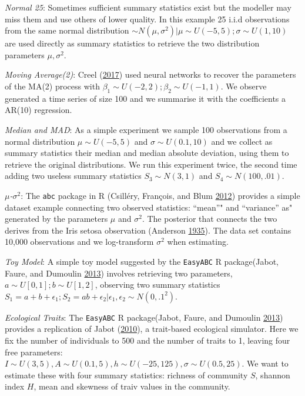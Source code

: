 \documentclass[]{article}
\begin{document}
\emph{Normal 25}: Sometimes sufficient summary statistics exist but the modeller may miss them and use others of lower quality.
In this example 25 i.i.d observations from the same normal distribution \(\sim N(\mu,\sigma^2)| \mu \sim U(-5,5); \sigma \sim U(1,10)\) are used directly as summary statistics to retrieve the two distribution parameters \(\mu,\sigma^2\).

\emph{Moving Average(2)}: Creel (\protect\hyperlink{ref-Creel2017}{2017}) used neural networks to recover the parameters of the MA(2) process with \(\beta_1 \sim U(-2,2); \beta_2\sim U(-1,1)\). We observe generated a time series of size 100 and we summarise it with the coefficients a AR(10) regression.

\emph{Median and MAD}: As a simple experiment we sample 100 observations from a normal distribution \(\mu \sim U(-5,5)\) and \(\sigma \sim U(0.1,10)\) and we collect as summary statistics their median and median absolute deviation, using them to retrieve the original distributions.
We run this experiment twice, the second time adding two useless summary statistics \(S_3 \sim N(3,1)\) and \(S_4 \sim N(100,.01)\).

\emph{\(\mu\)-\(\sigma^2\)}: The \texttt{abc} package in R (Csilléry, François, and Blum \protect\hyperlink{ref-Csillery2012}{2012}) provides a simple dataset example connecting two observed statistics: ``mean''" and ``variance'' as" generated by the parameters \(\mu\) and \(\sigma^2\). The posterior that connects the two derives from the Iris setosa observation (Anderson \protect\hyperlink{ref-Anderson1935}{1935}).
The data set contains 10,000 observations and we log-transform \(\sigma^2\) when estimating.

\emph{Toy Model}: A simple toy model suggested by the \texttt{EasyABC} R package(Jabot, Faure, and Dumoulin \protect\hyperlink{ref-Jabot2013}{2013}) involves retrieving two parameters, \(a \sim U[0,1]; b \sim U[1,2]\), observing two summary statistics \(S_1 = a + b + \epsilon_1 ; S_2 = a b +\epsilon_2 | \epsilon_1,\epsilon_2 \sim N(0,.1^2)\).

\emph{Ecological Traits}: The \texttt{EasyABC} R package(Jabot, Faure, and Dumoulin \protect\hyperlink{ref-Jabot2013}{2013}) provides a replication of Jabot (\protect\hyperlink{ref-Jabot2010}{2010}), a trait-based ecological simulator. Here we fix the number of individuals to 500 and the number of traits to 1, leaving four free parameters: \(I \sim U(3,5),A\sim U(0.1,5),h\sim U(-25,125),\sigma\sim U(0.5,25)\). We want to estimate these with four summary statistics: richness of community \(S\), shannon index \(H\), mean and skewness of traiv values in the community.
\end{document}
